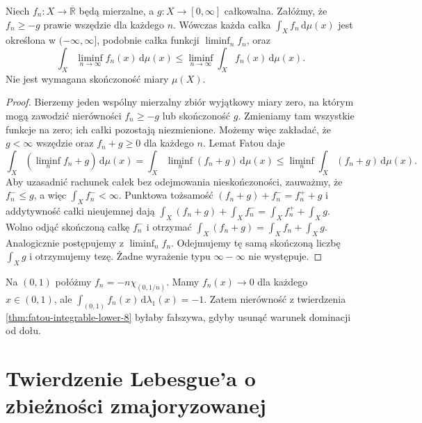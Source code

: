 \begin{twierdzenie}
\label{thm:fatou-integrable-lower-8}
Niech $f_n:X\to\overline{\mathbb R}$ będą mierzalne,
a $g:X\to[0,\infty]$ całkowalna. Załóżmy,
że $f_n\ge-g$ prawie wszędzie dla każdego $n$.
Wówczas każda całka $\int_Xf_n\,\mathrm d\mu(x)$
jest określona w $(-\infty,\infty]$, podobnie całka
funkcji $\liminf_nf_n$, oraz
\[
\int_X\liminf_{n\to\infty}f_n(x)\,\mathrm d\mu(x)
\le \liminf_{n\to\infty}\int_Xf_n(x)\,\mathrm d\mu(x).
\]
Nie jest wymagana skończoność miary $\mu(X)$.
\end{twierdzenie}
\begin{proof}
Bierzemy jeden wspólny mierzalny zbiór wyjątkowy miary zero,
na którym mogą zawodzić nierówności $f_n\ge-g$
lub skończoność $g$. Zmieniamy tam wszystkie
funkcje na zero; ich całki pozostają niezmienione.
Możemy więc zakładać, że $g<\infty$ wszędzie oraz
$f_n+g\ge0$ dla każdego $n$. Lemat Fatou daje
\[
\int_X(\liminf_nf_n+g)\,\mathrm d\mu(x)
=\int_X\liminf_n(f_n+g)\,\mathrm d\mu(x)
\le\liminf_n\int_X(f_n+g)\,\mathrm d\mu(x).
\]
Aby uzasadnić rachunek całek bez odejmowania
nieskończoności, zauważmy, że $f_n^-\le g$,
a więc $\int_X f_n^-<\infty$. Punktowa tożsamość
$(f_n+g)+f_n^-=f_n^++g$ i addytywność całki
nieujemnej dają
$\int_X(f_n+g)+\int_Xf_n^-=
\int_Xf_n^++\int_Xg$.
Wolno odjąć skończoną całkę $f_n^-$ i otrzymać
$\int_X(f_n+g)=\int_Xf_n+\int_Xg$.
Analogicznie postępujemy z $\liminf_nf_n$.
Odejmujemy tę samą skończoną liczbę $\int_Xg$
i otrzymujemy tezę. Żadne wyrażenie typu
$\infty-\infty$ nie występuje.
\end{proof}

\begin{przyklad}
Na $(0,1)$ połóżmy $f_n=-n\chi_{(0,1/n)}$.
Mamy $f_n(x)\to0$ dla każdego $x\in(0,1)$,
ale $\int_{(0,1)}f_n(x)\,\mathrm d\lambda_1(x)=-1$.
Zatem nierówność z twierdzenia
\ref{thm:fatou-integrable-lower-8} byłaby fałszywa,
gdyby usunąć warunek dominacji od dołu.
\end{przyklad}

\section{Twierdzenie Lebesgue'a o zbieżności zmajoryzowanej}

